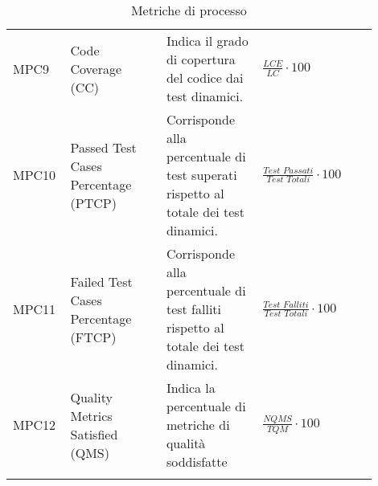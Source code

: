 \begin{longtable}{P{0.1\linewidth}P{0.25\linewidth}P{0.25\linewidth}P{0.30\linewidth}}
	    	MPC9 & Code Coverage (CC)
            & Indica il grado di copertura del codice dai test dinamici.
            & $\frac{LCE}{LC} \cdot 100$		\\[4pt]
            MPC10
            & Passed Test Cases Percentage (PTCP)
            & Corrisponde alla percentuale di test superati rispetto al totale dei test dinamici.
            & $\frac{\textit{Test Passati}}{\textit{Test Totali}} \cdot 100$	\\[4pt]
	    	MPC11
            & Failed Test Cases Percentage (FTCP)
            & Corrisponde alla percentuale di test falliti rispetto al totale dei test dinamici.
            & $\frac{\textit{Test Falliti}}{\textit{Test Totali}} \cdot 100$ \\[4pt]
            MPC12
            & Quality Metrics Satisfied (QMS)
            & Indica la percentuale di metriche di qualità soddisfatte
            & $\frac{NQMS}{TQM} \cdot 100$		\\[4pt]
    \caption{Metriche di processo}
\end{longtable}
\setlength\extrarowheight{0pt}
